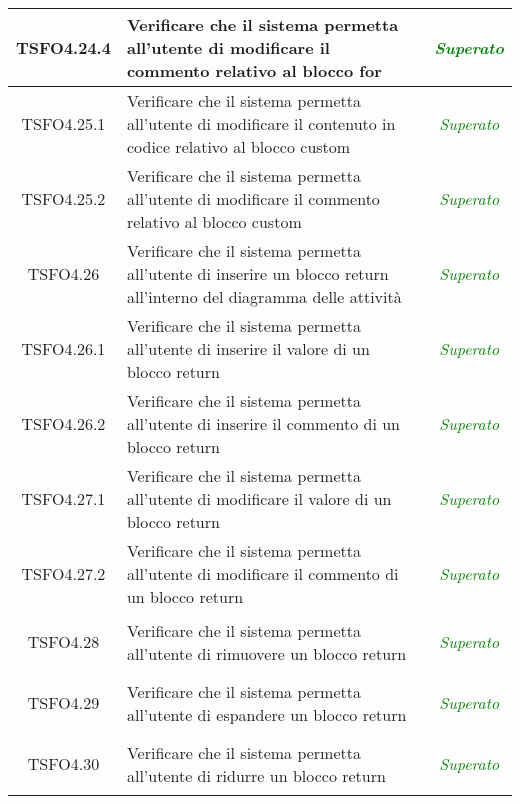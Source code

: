 \begin{longtable}{|c|>{}m{8cm}|c|}
\hypertarget{TSFO4.24.4}{TSFO4.24.4} & Verificare che il sistema permetta all'utente di modificare il commento relativo al blocco for & \textcolor{Green}{\textit{Superato}}\\ \hline
\hypertarget{TSFO4.25.1}{TSFO4.25.1} & Verificare che il sistema permetta all'utente di modificare il contenuto in codice relativo al blocco custom & \textcolor{Green}{\textit{Superato}}\\ \hline
\hypertarget{TSFO4.25.2}{TSFO4.25.2} & Verificare che il sistema permetta all'utente di modificare il commento relativo al blocco custom & \textcolor{Green}{\textit{Superato}}\\ \hline
\hypertarget{TSFO4.26}{TSFO4.26} & Verificare che il sistema permetta all'utente di inserire un blocco return all'interno del diagramma delle attività & \textcolor{Green}{\textit{Superato}}\\ \hline
\hypertarget{TSFO4.26.1}{TSFO4.26.1} & Verificare che il sistema permetta all'utente di inserire il valore di un blocco return & \textcolor{Green}{\textit{Superato}}\\ \hline
\hypertarget{TSFO4.26.2}{TSFO4.26.2} & Verificare che il sistema permetta all'utente di inserire il commento di un blocco return & \textcolor{Green}{\textit{Superato}}\\ \hline
\hypertarget{TSFO4.27.1}{TSFO4.27.1} & Verificare che il sistema permetta all'utente di modificare il valore di un blocco return & \textcolor{Green}{\textit{Superato}}\\ \hline
\hypertarget{TSFO4.27.2}{TSFO4.27.2} & Verificare che il sistema permetta all'utente di modificare il commento di un blocco return & \textcolor{Green}{\textit{Superato}}\\ \hline
\hypertarget{TSFO4.28}{TSFO4.28} & Verificare che il sistema permetta all'utente di rimuovere un blocco return & \textcolor{Green}{\textit{Superato}}\\ \hline
\hypertarget{TSFO4.29}{TSFO4.29} & Verificare che il sistema permetta all'utente di espandere un blocco return & \textcolor{Green}{\textit{Superato}}\\ \hline
\hypertarget{TSFO4.30}{TSFO4.30} & Verificare che il sistema permetta all'utente di ridurre un blocco return & \textcolor{Green}{\textit{Superato}}\\ \hline



\end{longtable}
